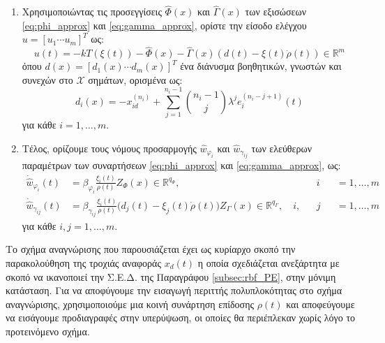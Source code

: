 \begin{enumerate}[label=\Roman*., ref=\Roman*]
	
	\item \label{step:control_input}
Χρησιμοποιώντας τις προσεγγίσεις $\hat{\Phi}(x)$ και $\hat{\Gamma}(x)$ των εξισώσεων \eqref{eq:phi_approx} και \eqref{eq:gamma_approx}, ορίστε την είσοδο ελέγχου $u = [u_1 \cdots u_m]^T$ ως:
	\begin{equation}
		u(t) = -k T(\xi(t)) - \hat{\Phi}(x) 
		- \hat{\Gamma}(x) \left( d(t) - \xi(t) \dot{\rho}(t) \right)
		\in \mathbb{R}^m
		\label{eq:schema_control_input}
	\end{equation}
	όπου $d(x) = [d_1(x) \cdots d_m(x)]^T$ ένα διάνυσμα βοηθητικών, γνωστών και συνεχών στο $\mathcal{X}$ σημάτων, ορισμένα ως:
	\begin{equation*}
	d_i(x) = - x_{id}^{(n_i)} + \sum_{j=1}^{n_i-1}\binom{n_i-1}{j}
	\lambda^j e_i^{(n_i-j+1)}(t)
	\end{equation*}
	για κάθε $i = 1,\dots,m$.
	
	\item \label{step:adaptation_laws}
	Τέλος, ορίζουμε τους νόμους προσαρμογής $\hat{w}_{\varphi_i}$ και $\hat{w}_{\gamma_{ij}}$ των ελεύθερων παραμέτρων των συναρτήσεων \eqref{eq:phi_approx} και \eqref{eq:gamma_approx}, ως:
	\begin{equation}
	\begin{alignedat}{3}
	\dot{\hat{w}}_{\varphi_i}(t) &= 
	\beta_{\varphi_i} \frac{\xi_i(t)}{\rho(t)} Z_{\Phi}(x) 
	\in \mathbb{R}^{q_{\Phi}}, \quad &&i &&= 1,\dots,m \\
	\dot{\hat{w}}_{\gamma_{ij}}(t) &= \beta_{\gamma_{ij}} \frac{\xi_i(t)}{\rho(t)}
	\big( d_j(t) - \xi_j(t) \dot{\rho}(t) \big) Z_{\Gamma}(x)
	\in \mathbb{R}^{q_{\Gamma}},
	\quad i,&&j &&= 1,\dots,m
	\end{alignedat}
	\label{eq:schema_adapt_laws}
	\end{equation}
	για κάθε $i,j = 1,\dots,m$.\\
\end{enumerate}
\begin{remark}
	Το σχήμα αναγνώρισης που παρουσιάζεται έχει ως κυρίαρχο σκοπό την παρακολούθηση της τροχιάς αναφοράς $x_d(t)$ η οποία σχεδιάζεται ανεξάρτητα με σκοπό να ικανοποιεί την Σ.Ε.Δ. της Παραγράφου \ref{subsec:rbf_PE}, στην μόνιμη κατάσταση. Για να αποφύγουμε την εισαγωγή περιττής πολυπλοκότητας στο σχήμα αναγνώρισης, χρησιμοποιούμε μια κοινή συνάρτηση επίδοσης $\rho(t)$ και αποφεύγουμε να εισάγουμε προδιαγραφές στην υπερύψωση, οι οποίες θα περιέπλεκαν χωρίς λόγο το προτεινόμενο σχήμα. \\
	 
\end{remark}
